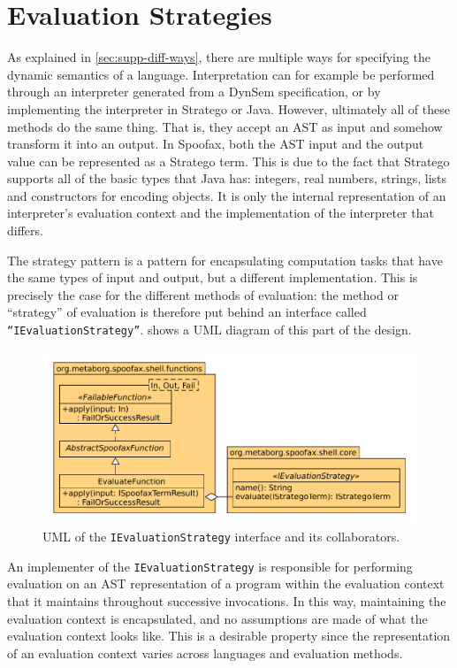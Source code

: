 \section{Evaluation Strategies}
\label{sec:eval-strat}
As explained in \cref{sec:supp-diff-ways}, there are multiple ways for
specifying the dynamic semantics of a language. Interpretation can for example
be performed through an interpreter generated from a DynSem specification, or by
implementing the interpreter in Stratego or Java. However, ultimately all of
these methods do the same thing. That is, they accept an AST as input and
somehow transform it into an output. In Spoofax, both the AST input and the
output value can be represented as a Stratego term. This is due to the fact that
Stratego supports all of the basic types that Java has: integers, real numbers,
strings, lists and constructors for encoding objects. It is only the internal
representation of an interpreter's evaluation context and the implementation of
the interpreter that differs.

The strategy pattern is a pattern for encapsulating computation tasks that have
the same types of input and output, but a different implementation. This is
precisely the case for the different methods of evaluation: the method or
``strategy'' of evaluation is therefore put behind an interface called
\texttt{``IEvaluationStrategy''}.  shows a UML diagram
of this part of the design.

\begin{figure}[b]
  \centering
  \includegraphics[width=\textwidth]{uml-eval-strat}
  \caption{UML of the \texttt{IEvaluationStrategy} interface and its
    collaborators.}
  \label{fig:uml-eval-strat}
\end{figure}

An implementer of the \texttt{IEvaluationStrategy} is responsible for performing
evaluation on an AST representation of a program within the evaluation context
that it maintains throughout successive invocations. In this way, maintaining
the evaluation context is encapsulated, and no assumptions are made of what the
evaluation context looks like. This is a desirable property since the
representation of an evaluation context varies across languages and evaluation
methods.

